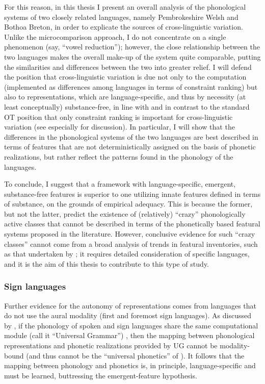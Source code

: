 For this reason, in this thesis I present an overall analysis of the phonological systems of two closely related languages, namely Pembrokeshire Welsh and Bothoa Breton, in order to explicate the sources of cross\hyp linguistic variation. Unlike the microcomparison approach, I do not concentrate on a single phenomenon (say, \enquote{vowel reduction}); however, the close relationship between the two languages makes the overall make\hyp up of the system quite comparable, putting the similarities and differences between the two into greater relief. I will defend the position that cross\hyp linguistic variation is due not only to the computation (implemented as differences among languages in terms of constraint ranking) but also to representations, which are language\hyp specific, and thus by necessity (at least conceptually) substance\hyp free, in line with \citet{moren-serbian,moren-foa,uffmann07:_restr,blaho-diss,youssef10:_laryn_buchan_scots} and in contrast to the standard OT position that only constraint ranking is important for cross\hyp linguistic variation (see especially \citealp{uffmann07:_restr} for discussion). In particular, I will show that the differences in the phonological systems of the two languages are best described in terms of features that are not deterministically assigned on the basis of phonetic realizations, but rather reflect the patterns found in the phonology of the languages.

To conclude, I suggest that a framework with language\hyp specific, emergent, substance\hyp free features is superior to one utilizing innate features defined in terms of substance, on the grounds of empirical adequacy. This is because the former, but not the latter, predict the existence of (relatively) \enquote{crazy} phonologically active classes that cannot be described in terms of the phonetically based featural systems proposed in the literature. However, conclusive evidence for such \enquote{crazy classes} cannot come from a broad analysis of trends in featural inventories, such as that undertaken by \citet{mielke-diss}; it requires detailed consideration of specific languages, and it is the aim of this thesis to contribute to this type of study.

\subsubsection{Sign languages}
\label{sec:sign-languages}

Further evidence for the autonomy of representations comes from languages that do not use the aural modality (first and foremost sign languages). As discussed by \citet{hulst93:_units_analy_signs,moren-psm}, if the phonology of spoken and sign languages share the same computational module (call it \enquote{Universal Grammar}) \citep{sandler93:_sign}, then the mapping between phonological representations and phonetic realizations provided by UG cannot be modality\hyp bound (and thus cannot be the \enquote{universal phonetics} of \citealp{spe}). It follows that the mapping between phonology and phonetics is, in principle, language\hyp specific and must be learned, buttressing the emergent\hyp feature hypothesis.

